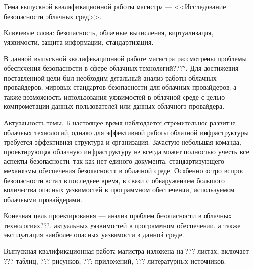 
Тема выпускной квалификационной работы магистра --- <<Исследование безопасности облачных сред>>.

Ключевые слова: безопасность, облачные вычисления, виртуализация, уязвимости, защита информации, стандартизация.

В данной выпускной квалификационной работе магистра рассмотрены проблемы обеспечения безопасности в сфере облачных технологий????.
Для достижения поставленной цели был необходим детальный анализ работы облачных провайдеров, мировых стандартов безопасности для облачных провайдеров, а также возможность использования уязвимостей в облачной среде с целью компрометации данных пользователей или данных облачного провайдера.

Актуальность темы.
В настоящее время наблюдается стремительное развитие облачных технологий, однако для эффективной работы облачной инфраструктуры требуется эффективная структура и организация.
Зачастую небольшая команда, проектирующая облачную инфраструктуру не всегда может полностью учесть все аспекты безопасности, так как нет единого документа, стандартизующего механизмы обеспечения безопасности в облачной среде.
Особенно остро вопрос безопасности встал в последнее время, в связи с обнаружением большого количества опасных уязвимостей в программном обеспечении, используемом облачными провайдерами.

Конечная цель проектирования --- анализ проблем безопасности в облачных технологиях???, актуальных уязвимостей в программном обеспечении, а также эксплуатация наиболее опасных уязвимости в данной среде.

Выпускная квалификационная работа магистра изложена на ??? листах, включает ??? таблиц, ??? рисунков, ??? приложений, ??? литературных источников.

\clearpage
